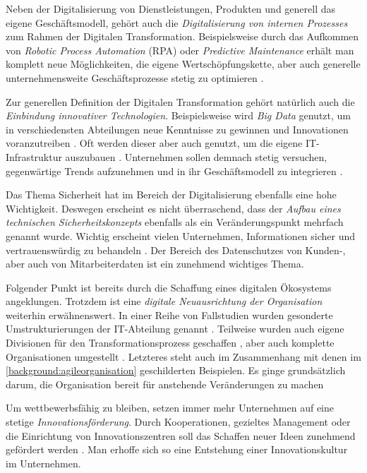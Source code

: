 Neben der Digitalisierung  von Dienstleistungen, Produkten und generell das eigene Geschäftsmodell, gehört auch die \textit{Digitalisierung von internen Prozesses} zum Rahmen der Digitalen Transformation. Beispielsweise durch das Aufkommen von \textit{Robotic Process Automation} (RPA) oder \textit{Predictive Maintenance} erhält man komplett neue Möglichkeiten, die eigene Wertschöpfungskette, aber auch generelle unternehmensweite Geschäftsprozesse  stetig zu optimieren \cite[S. 16f.]{urbach_digitalization_2018}.

Zur generellen Definition der Digitalen Transformation gehört natürlich auch die \textit{Einbindung innovativer Technologien}. Beispielsweise wird \textit{Big Data} genutzt, um in verschiedensten Abteilungen neue Kenntnisse zu gewinnen und Innovationen voranzutreiben \cite[S. 22]{gartner_fallstudien_2018}. Oft werden dieser aber auch genutzt, um die eigene IT-Infrastruktur auszubauen \cite[S. 8]{chanias_digital_2018}. Unternehmen sollen demnach stetig versuchen, gegenwärtige Trends aufzunehmen und in ihr Geschäftsmodell zu integrieren \cite[S. S. 89]{gartner_fallstudien_2018}.

Das Thema Sicherheit hat im Bereich der Digitalisierung ebenfalls eine hohe Wichtigkeit. Deswegen erscheint es nicht überraschend, dass der \textit{Aufbau eines technischen Sicherheitskonzepts} ebenfalls als ein Veränderungspunkt mehrfach genannt wurde. Wichtig erscheint vielen Unternehmen, Informationen sicher und vertrauenswürdig zu behandeln \cite[S. 8]{weber_digital_2015}. Der Bereich des Datenschutzes von Kunden-, aber auch von Mitarbeiterdaten ist ein zunehmend wichtiges Thema.

Folgender Punkt ist bereits durch die Schaffung eines digitalen Ökosystems angeklungen. Trotzdem ist eine \textit{digitale Neuausrichtung der Organisation} weiterhin erwähnenswert. In einer Reihe von Fallstudien wurden gesonderte Umstrukturierungen der IT-Abteilung genannt \cite[S. 393]{urbach_digitalization_2018}.  Teilweise wurden auch eigene Divisionen für den Transformationsprozess geschaffen \cite[S. 8]{beule_digital_2019}, aber auch komplette Organisationen umgestellt \cite[S. 4]{kawohl_digitale_2016}. Letzteres steht auch im Zusammenhang mit denen im \ref{background:agileorganisation} geschilderten Beispielen. Es ginge grundsätzlich darum, die Organisation bereit für anstehende Veränderungen zu machen \cite[S. 31]{berghaus_2016}

Um wettbewerbsfähig zu bleiben, setzen immer mehr Unternehmen auf eine stetige \textit{Innovationsförderung}. Durch Kooperationen, gezieltes Management oder die Einrichtung von Innovationszentren soll das Schaffen neuer Ideen zunehmend gefördert werden \cite[S. 33]{buxmann_digitalisieren_2016}. Man erhoffe sich so eine Entstehung einer Innovationskultur im Unternehmen.

